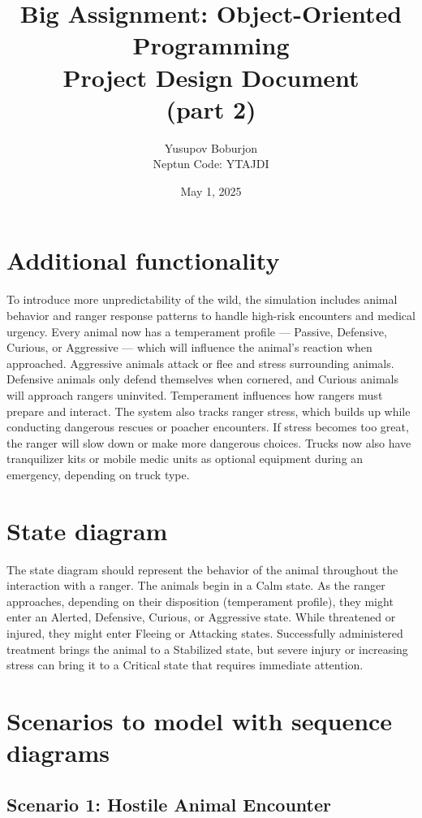 \documentclass[a4paper,12pt]{article}
\title{Big Assignment: Object-Oriented Programming\\\large Project Design Document\\(part 2)}
\author{Yusupov Boburjon\\Neptun Code: YTAJDI}
\date{May 1, 2025}
\begin{document}
\maketitle

\newpage

\section{\textbf{Additional functionality}}

To introduce more unpredictability of the wild, the simulation includes animal behavior and ranger response patterns to handle high-risk encounters and medical urgency.
Every animal now has a temperament profile — Passive, Defensive, Curious, or Aggressive — which will influence the animal’s reaction when approached. Aggressive animals attack or flee and stress surrounding animals. Defensive animals only defend themselves when cornered, and Curious animals will approach rangers uninvited. Temperament influences how rangers must prepare and interact.
The system also tracks ranger stress, which builds up while conducting dangerous rescues or poacher encounters. If stress becomes too great, the ranger will slow down or make more dangerous choices. Trucks now also have tranquilizer kits or mobile medic units as optional equipment during an emergency, depending on truck type.

\section{\textbf{State diagram}}

The state diagram should represent the behavior of the animal throughout the interaction with a ranger. The animals begin in a Calm state. As the ranger approaches, depending on their disposition (temperament profile), they might enter an Alerted, Defensive, Curious, or Aggressive state. While threatened or injured, they might enter Fleeing or Attacking states. Successfully administered treatment brings the animal to a Stabilized state, but severe injury or increasing stress can bring it to a Critical state that requires immediate attention.

\section{\textbf{Scenarios to model with sequence diagrams}}
\subsection{Scenario 1: Hostile Animal Encounter}
\end{document}
